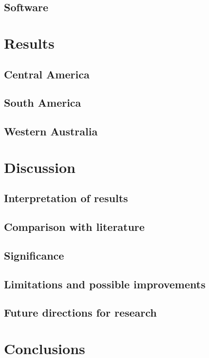 \documentclass[12pt,a4paper,twoside]{book}
\begin{document}
\section{Software}

	\chapter{Results}
	
\section{Central America}

\section{South America}

\section{Western Australia}

	\chapter{Discussion}
	
\section{Interpretation of results}

\section{Comparison with literature}

\section{Significance}

\section{Limitations and possible improvements}

\section{Future directions for research}

	\chapter{Conclusions}
	
\end{document}
